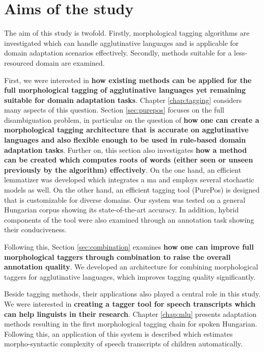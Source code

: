 \section{Aims of the study}

The aim of this study is twofold. 
Firstly, morphological tagging algorithms are investigated which can handle agglutinative languages and is applicable for domain adaptation scenarios effectively. 
Secondly, methods suitable for a less-resourced domain are examined.

First, we were interested in \textbf{how existing methods can be applied for the full morphological tagging of agglutinative languages yet remaining suitable for domain adaptation tasks}. 
Chapter \ref{chap:tagging} considers many aspects of this question. 
Section \ref{sec:purepos} focuses on the full disambiguation problem, in particular on the question of \textbf{how one can create a morphological tagging architecture that is accurate on agglutinative languages and also flexible enough to be used in rule-based domain adaptation tasks}.
Further on,  this section also investigates \textbf{how a method can be created which computes roots of words (either seen or unseen previously by the algorithm) effectively}. 
On the one hand, an efficient lemmatizer was developed which integrates a \gls{ma} and employs several stochastic models as well. %
On the other hand, an efficient tagging tool (PurePos) is designed that is customizable for diverse domains.
Our system was tested on a general Hungarian corpus showing its state-of-the-art accuracy. 
In addition, hybrid components of the tool were also examined through an annotation task showing their conduciveness.


Following this, Section \ref{sec:combination} examines \textbf{how one can improve full morphological taggers through combination to raise the overall annotation quality}.
We developed an architecture for combining morphological taggers for agglutinative languages, which improves tagging quality significantly.


Beside tagging methods, their applications also played a central role in this study.
We were interested in \textbf{creating a tagger tool for speech transcripts which can help linguists in their research}.
Chapter \ref{chap:mlu} presents adaptation methods resulting in the first morphological tagging chain for spoken Hungarian.
Following this, an application of this system is described which estimates morpho-syntactic complexity of speech transcripts of children automatically.

